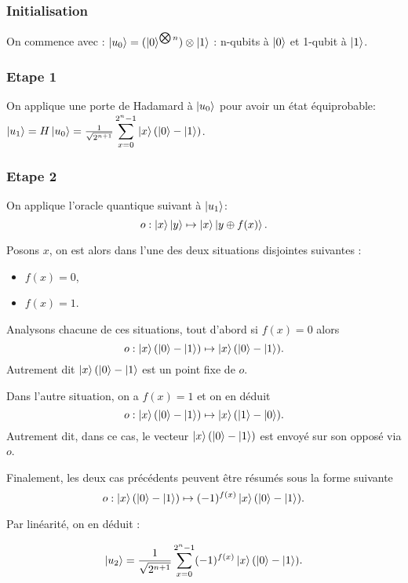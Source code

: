 \subsubsection{Initialisation}
On commence avec :
$\ket{u_0} = (\ket{0}^{\bigotimes n}) \otimes \ket{1}$
: n-qubits à $\ket{0}$ et 1-qubit à $\ket{1}$.

\subsubsection{Etape 1}

On applique une porte de Hadamard à $\ket{u_0}$ pour avoir un état équiprobable:
$\ket{u_1} = H\ket{u_0} = \frac{1}{\sqrt{2^{n + 1}}}
\displaystyle\sum_{x=0}^{2^n-1} \ket{x}(\ket{0} - \ket{1})$.

\subsubsection{Etape 2}
On applique l'oracle quantique suivant à $\ket{u_1}$:
\[ o : \ket{x}\ket{y}\mapsto \ket{x}\ket{y\oplus f(x)}. \]

Posons $x$, on est alors dans l'une des deux situations disjointes suivantes :
\begin{itemize}
\item $f(x) = 0$,
\item $f(x) = 1$.
\end{itemize}

Analysons chacune de ces situations, tout d'abord si $f(x) = 0$ alors
\[
o : \ket{x}(\ket{0} - \ket{1}) \mapsto \ket{x}(\ket{0} - \ket{1}).
\]
Autrement dit $\ket{x}(\ket{0} - \ket{1}$ est un  point fixe de $o$.

Dans l'autre situation, on a $f(x) = 1$ et on en déduit
\[
o : \ket{x}(\ket{0} - \ket{1}) \mapsto \ket{x}(\ket{1} - \ket{0}).
\]
Autrement dit, dans ce cas, le vecteur $\ket{x}(\ket{0} - \ket{1})$
est envoyé sur son opposé via $o$.

Finalement, les deux cas précédents peuvent être résumés sous la forme suivante
\[
o : \ket{x}(\ket{0} - \ket{1}) \mapsto (-1)^{f(x)}\ket{x}(\ket{0} - \ket{1}).
\]

Par linéarité, on en déduit :

\begin{equation}\ket{u_2} = \frac{1}{\sqrt{2^{n + 1}}} 
\displaystyle\sum_{x=0}^{2^n-1} (-1)^{f(x)}\ket{x}(\ket{0} - \ket{1}) .
\end{equation}

